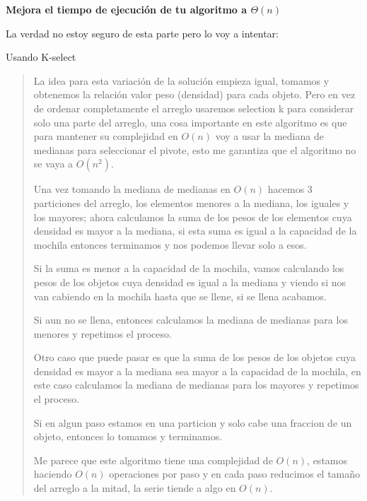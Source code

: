 \textbf{Mejora el tiempo de ejecución de tu algoritmo a $\Theta(n)$}\vspace{.2cm}

La verdad no estoy seguro de esta parte pero lo voy a intentar:

\textcolor{bibi}{Usando K-select}
\begin{quote}
    La idea para esta variación de la solución empieza igual, tomamos y obtenemos la relación valor peso (densidad) para cada objeto. Pero en vez de ordenar completamente el arreglo usaremos selection k para considerar solo una parte del arreglo, una cosa importante en este algoritmo es que para mantener su complejidad en $O(n)$ voy a usar la mediana de medianas para seleccionar el pivote, esto me garantiza que el algoritmo no se vaya a $O(n^2)$. \vspace{.2cm}

    Una vez tomando la mediana de medianas en $O(n)$ hacemos 3 particiones del arreglo, los elementos menores a la mediana, los iguales y los mayores; ahora calculamos la suma de los pesos de los elementos cuya densidad es mayor a la mediana, si esta suma es igual a la capacidad de la mochila entonces terminamos y nos podemos llevar solo a esos. \vspace{.2cm}

    Si la suma es menor a la capacidad de la mochila, vamos calculando los pesos de los objetos cuya densidad es igual a la mediana y viendo si nos van cabiendo en la mochila hasta que se llene, si se llena acabamos. \vspace{.2cm}

    Si aun no se llena, entonces calculamos la mediana de medianas para los menores y repetimos el proceso. \vspace{.2cm}

    Otro caso que puede pasar es que la suma de los pesos de los objetos cuya densidad es mayor a la mediana sea mayor a la capacidad de la mochila, en este caso calculamos la mediana de medianas para los mayores y repetimos el proceso. \vspace{.2cm}

    Si en algun paso estamos en una particion y solo cabe una fraccion de un objeto, entonces lo tomamos y terminamos. \vspace{.2cm}

    Me parece que este algoritmo tiene una complejidad de $O(n)$, estamos haciendo $O(n)$ operaciones por paso y en cada paso reducimos el tamaño del arreglo a la mitad, la serie tiende a algo en $O(n)$.
\end{quote}